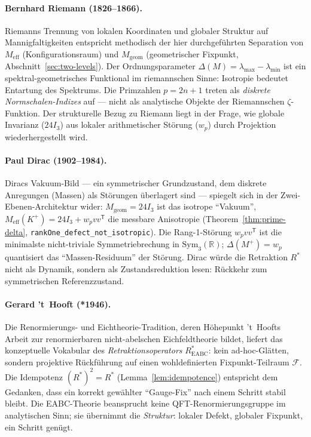 \documentclass[11pt,a4paper]{article}
\begin{document}
\paragraph{Bernhard Riemann (1826--1866).}
Riemanns Trennung von lokalen Koordinaten und globaler Struktur auf Mannigfaltigkeiten
entspricht methodisch der hier durchgeführten Separation von
$M_{\mathrm{eff}}$ (Konfigurationsraum) und $M_{\mathrm{geom}}$ (geometrischer Fixpunkt,
Abschnitt~\ref{sec:two-levels}).
Der Ordnungsparameter $\Delta(M)=\lambda_{\max}-\lambda_{\min}$ ist ein
spektral-geometrisches Funktional im riemannschen Sinne: Isotropie bedeutet
Entartung des Spektrums.
Die Primzahlen $p=2n+1$ treten als \emph{diskrete Normschalen-Indizes} auf ---
nicht als analytische Objekte der Riemannschen $\zeta$-Funktion.
Der strukturelle Bezug zu Riemann liegt in der Frage, wie globale Invarianz
($24I_3$) aus lokaler arithmetischer Störung ($w_p$) durch Projektion
wiederhergestellt wird.

\paragraph{Paul Dirac (1902--1984).}
Diracs Vakuum-Bild --- ein symmetrischer Grundzustand, dem diskrete
Anregungen (Massen) als Störungen überlagert sind --- spiegelt sich in der
Zwei-Ebenen-Architektur wider:
$M_{\mathrm{geom}}=24I_3$ ist das isotrope ``Vakuum'',
$M_{\mathrm{eff}}(K^+)=24I_3+w_pvv^{\mathsf T}$ die messbare Anisotropie
(Theorem~\ref{thm:prime-delta}, \texttt{rankOne\_defect\_not\_isotropic}).
Die Rang-1-Störung $w_pvv^{\mathsf T}$ ist die minimalste nicht-triviale
Symmetriebrechung in $\mathrm{Sym}_3(\mathbb{R})$; $\Delta(M^+)=w_p$ quantisiert
das ``Massen-Residuum'' der Störung.
Dirac würde die Retraktion $R^*$ nicht als Dynamik, sondern als
Zustandsreduktion lesen: Rückkehr zum symmetrischen Referenzzustand.

\paragraph{Gerard 't~Hooft (*1946).}
Die Renormierungs- und Eichtheorie-Tradition, deren Höhepunkt 't~Hoofts Arbeit
zur renormierbaren nicht-abelschen Eichfeldtheorie bildet, liefert das
konzeptuelle Vokabular des \emph{Retraktionsoperators} $R^*_{\mathrm{EABC}}$:
kein ad-hoc-Glätten, sondern projektive Rückführung auf einen wohldefinierten
Fixpunkt-Teilraum $\mathcal{F}$.
Die Idempotenz $(R^*)^2=R^*$ (Lemma~\ref{lem:idempotence}) entspricht dem
Gedanken, dass ein korrekt gewählter ``Gauge-Fix'' nach einem Schritt stabil bleibt.
Die EABC-Theorie beansprucht keine QFT-Renormierungsgruppe im analytischen Sinn;
sie übernimmt die \emph{Struktur}: lokaler Defekt, globaler Fixpunkt, ein Schritt genügt.
\end{document}
